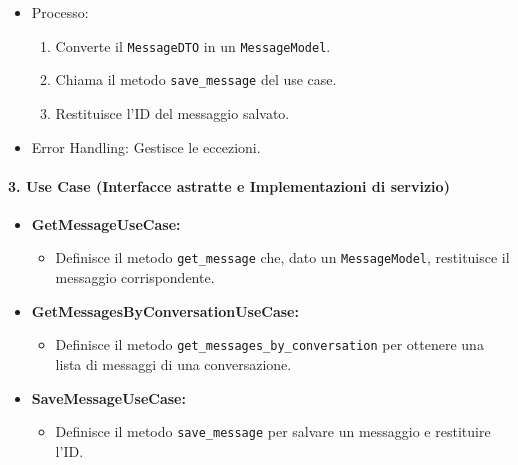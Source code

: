 \begin{itemize}
\begin{itemize}
            \item Processo:
            \begin{enumerate}
                \item Converte il \texttt{MessageDTO} in un \texttt{MessageModel}.
                \item Chiama il metodo \texttt{save\_message} del use case.
                \item Restituisce l’ID del messaggio salvato.
            \end{enumerate}
            \item Error Handling: Gestisce le eccezioni.
        \end{itemize}
    \end{itemize}

    \paragraph{3. Use Case (Interfacce astratte e Implementazioni di servizio)}
    \begin{itemize}
        \item \textbf{GetMessageUseCase:}
        \begin{itemize}
            \item Definisce il metodo \texttt{get\_message} che, dato un \texttt{MessageModel}, restituisce il messaggio corrispondente.
        \end{itemize}
        \item \textbf{GetMessagesByConversationUseCase:}
        \begin{itemize}
            \item Definisce il metodo \texttt{get\_messages\_by\_conversation} per ottenere una lista di messaggi di una conversazione.
        \end{itemize}
        \item \textbf{SaveMessageUseCase:}
        \begin{itemize}
            \item Definisce il metodo \texttt{save\_message} per salvare un messaggio e restituire l'ID.
        \end{itemize}
    \end{itemize}

